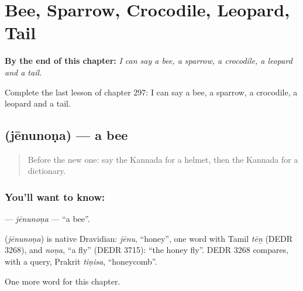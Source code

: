 
\chapter{Bee, Sparrow, Crocodile, Leopard, Tail}
\label{ch:ka-bee-sparrow-crocodile-leopard-tail}

\begin{chapteropening}
\textbf{By the end of this chapter:} \emph{I can say a bee, a sparrow, a crocodile, a leopard and a tail.}

Complete the last lesson of chapter 297: I can say a bee, a sparrow, a crocodile, a leopard and a tail.
\end{chapteropening}

\section[\texorpdfstring{\kn{ಜೇನುನೊಣ} (jēnunoṇa)}{ಜೇನುನೊಣ (jēnunoṇa)}]{ (jēnunoṇa) — a bee}

\label{lesson:KA-C297-jenunona}



\begin{quote}
Before the new one: say the Kannada for a helmet, then the Kannada for a dictionary.
\end{quote}

\subsection*{You'll want to know: }
\textbf{} — \emph{jēnunoṇa} — \textquotedblleft{}a bee\textquotedblright{}.

\begin{cousinweb}
\textbf{} (\emph{jēnunoṇa}) is native Dravidian: \emph{jēnu}, \textquotedblleft{}honey\textquotedblright{}, one word with Tamil \emph{tēṉ} (DEDR 3268), and \emph{noṇa}, \textquotedblleft{}a fly\textquotedblright{} (DEDR 3715): \textquotedblleft{}the honey fly\textquotedblright{}. DEDR 3268 compares, with a query, Prakrit \emph{tiṇisa}, \textquotedblleft{}honeycomb\textquotedblright{}.
\end{cousinweb}

\begin{grammarlens}[title={What you've built}]
One more word for this chapter.
\end{grammarlens}

